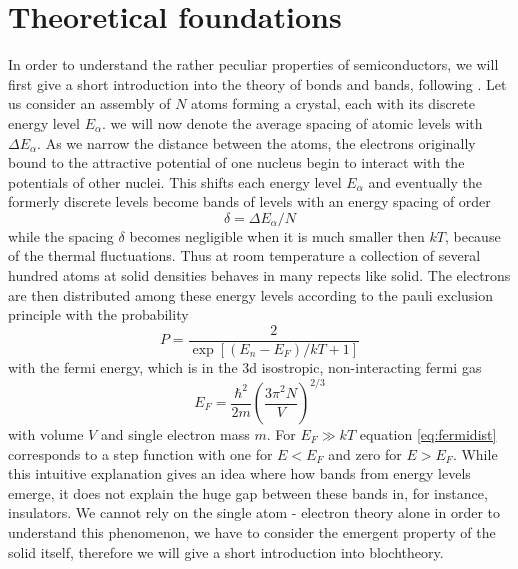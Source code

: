 \section{Theoretical foundations}
In order to understand the rather peculiar properties of semiconductors, we will first give
a short introduction into the theory of bonds and bands, following \cite{phillips2012bonds}.
Let us consider an assembly of $N$ atoms forming a crystal, each with its discrete energy level $E_\alpha$.
we will now denote the average spacing of atomic levels with $\Delta E_\alpha$. As we narrow the distance
between the atoms, the electrons originally bound to the attractive potential of one nucleus begin to interact
with the potentials of other nuclei. This shifts each energy level $E_\alpha$ and eventually the formerly
discrete levels become bands of levels with an energy spacing of order
\begin{equation}
    \delta = \Delta E_\alpha / N
\end{equation}
while the spacing $\delta$ becomes negligible when it is much smaller then $kT$, because 
of the thermal fluctuations. Thus at room temperature a collection of several hundred atoms
at solid densities behaves in many repects like solid. The electrons are then distributed among these
energy levels according to the pauli exclusion principle with the probability
\begin{equation}
    P = \frac{2}{\exp \left [(E_n - E_F)/ kT  + 1\right ]}
    \label{eq:fermidist}
\end{equation}
with the fermi energy, which is in the 3d isostropic, non-interacting fermi gas
\begin{equation}
    E_F = \frac{\hbar^2  }{2m} \left ( \frac{3 \pi^2 N}{V} \right )^{2/3}
\end{equation}
with volume $V$ and single electron mass $m$. For $E_F \gg kT$ equation \eqref{eq:fermidist} corresponds
to a step function with one for $E < E_F$ and zero for $E > E_F$. While this intuitive explanation gives
an idea where how bands from energy levels emerge, it does not explain the huge gap between these bands
in, for instance, insulators. We cannot rely on the single atom - electron theory alone in order to understand
this phenomenon, we have to consider the emergent property of the solid itself, therefore we will 
give a short introduction into blochtheory.
